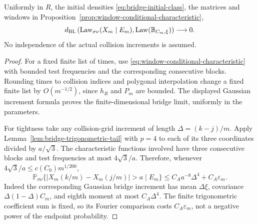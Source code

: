 \begin{theorem}
\label{thm:collision-window-bridge}
Uniformly in $R$, the initial densities \eqref{eq:bridge-initial-class},
the matrices and windows in
Proposition~\ref{prop:window-conditional-characteristic},
\begin{equation}\label{eq:collision-window-bridge}
 d_{\rm BL}\left(\operatorname{Law}_{\sigma\nu}(X_m\mid E_m),
                         \operatorname{Law}(\mathbb B_{C_m,\xi})\right)
                                      \longrightarrow0.
\end{equation}
No independence of the actual collision increments is assumed.
\end{theorem}
\begin{proof}
For a fixed finite list of times, use
\eqref{eq:window-conditional-characteristic} with bounded test
frequencies and the corresponding consecutive blocks. Rounding times
to collision indices and polygonal interpolation change a fixed
finite list by $O(m^{-1/2})$, since $h_R$ and $P_m$ are bounded.
The displayed Gaussian increment formula proves the finite-dimensional
bridge limit, uniformly in the parameters.

For tightness take any collision-grid increment of length
$\Delta=(k-j)/m$. Apply Lemma~\ref{lem:bridge-trigonometric-tail}
with $p=4$ to each of its three coordinates divided by $a/\sqrt3$.
The characteristic functions involved have three consecutive blocks
and test frequencies at most $4\sqrt3/a$. Therefore, whenever
$4\sqrt3/a\le c(C_0)m^{1/200}$,
\begin{equation}\label{eq:conditional-increment-tail}
 \mathbb P_{\sigma\nu}\{|X_m(k/m)-X_m(j/m)|>a\mid E_m\}
          \le C_A a^{-8}\Delta^4+C_A\varepsilon_m.
\end{equation}
Indeed the corresponding Gaussian bridge increment has mean
$\Delta\xi$, covariance $\Delta(1-\Delta)C_m$, and eighth moment
at most $C_A\Delta^4$. The finite trigonometric coefficient sum is
fixed, so its Fourier comparison costs $C_A\varepsilon_m$,
not a negative power of the endpoint probability.


\end{proof}

